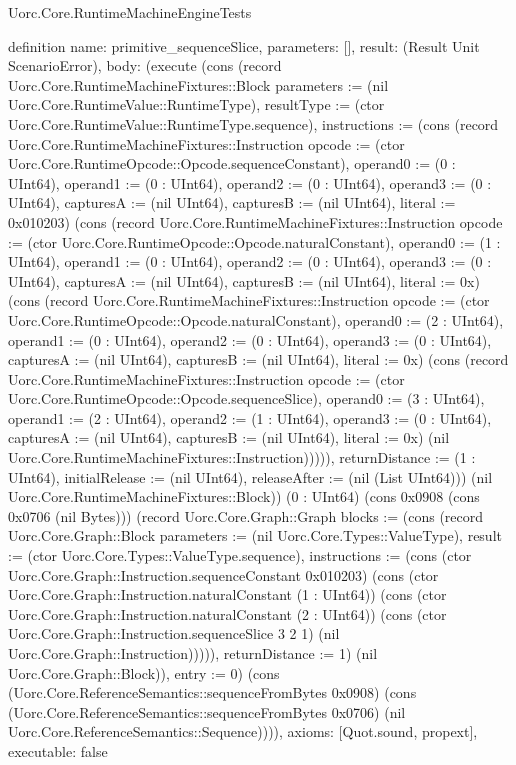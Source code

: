 \begin{lexlean}{Uorc.Core.RuntimeMachineEngineTests}
\begin{semanticmodule}
definition{
  name: primitive_sequenceSlice,
  parameters: [],
  result: (Result Unit ScenarioError),
  body: (execute (cons (record Uorc.Core.RuntimeMachineFixtures::Block {parameters := (nil Uorc.Core.RuntimeValue::RuntimeType), resultType := (ctor Uorc.Core.RuntimeValue::RuntimeType.sequence), instructions := (cons (record Uorc.Core.RuntimeMachineFixtures::Instruction {opcode := (ctor Uorc.Core.RuntimeOpcode::Opcode.sequenceConstant), operand0 := (0 : UInt64), operand1 := (0 : UInt64), operand2 := (0 : UInt64), operand3 := (0 : UInt64), capturesA := (nil UInt64), capturesB := (nil UInt64), literal := 0x010203}) (cons (record Uorc.Core.RuntimeMachineFixtures::Instruction {opcode := (ctor Uorc.Core.RuntimeOpcode::Opcode.naturalConstant), operand0 := (1 : UInt64), operand1 := (0 : UInt64), operand2 := (0 : UInt64), operand3 := (0 : UInt64), capturesA := (nil UInt64), capturesB := (nil UInt64), literal := 0x}) (cons (record Uorc.Core.RuntimeMachineFixtures::Instruction {opcode := (ctor Uorc.Core.RuntimeOpcode::Opcode.naturalConstant), operand0 := (2 : UInt64), operand1 := (0 : UInt64), operand2 := (0 : UInt64), operand3 := (0 : UInt64), capturesA := (nil UInt64), capturesB := (nil UInt64), literal := 0x}) (cons (record Uorc.Core.RuntimeMachineFixtures::Instruction {opcode := (ctor Uorc.Core.RuntimeOpcode::Opcode.sequenceSlice), operand0 := (3 : UInt64), operand1 := (2 : UInt64), operand2 := (1 : UInt64), operand3 := (0 : UInt64), capturesA := (nil UInt64), capturesB := (nil UInt64), literal := 0x}) (nil Uorc.Core.RuntimeMachineFixtures::Instruction))))), returnDistance := (1 : UInt64), initialRelease := (nil UInt64), releaseAfter := (nil (List UInt64))}) (nil Uorc.Core.RuntimeMachineFixtures::Block)) (0 : UInt64) (cons 0x0908 (cons 0x0706 (nil Bytes))) (record Uorc.Core.Graph::Graph {blocks := (cons (record Uorc.Core.Graph::Block {parameters := (nil Uorc.Core.Types::ValueType), result := (ctor Uorc.Core.Types::ValueType.sequence), instructions := (cons (ctor Uorc.Core.Graph::Instruction.sequenceConstant 0x010203) (cons (ctor Uorc.Core.Graph::Instruction.naturalConstant (1 : UInt64)) (cons (ctor Uorc.Core.Graph::Instruction.naturalConstant (2 : UInt64)) (cons (ctor Uorc.Core.Graph::Instruction.sequenceSlice 3 2 1) (nil Uorc.Core.Graph::Instruction))))), returnDistance := 1}) (nil Uorc.Core.Graph::Block)), entry := 0}) (cons (Uorc.Core.ReferenceSemantics::sequenceFromBytes 0x0908) (cons (Uorc.Core.ReferenceSemantics::sequenceFromBytes 0x0706) (nil Uorc.Core.ReferenceSemantics::Sequence)))),
  axioms: [Quot.sound, propext],
  executable: false
}


\end{semanticmodule}
\end{lexlean}
